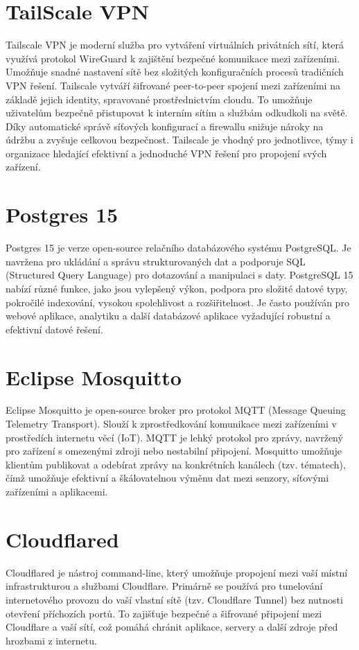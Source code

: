 \section{TailScale VPN}\label{sec:tailscale}
Tailscale VPN je moderní služba pro vytváření virtuálních privátních sítí, která využívá protokol WireGuard k zajištění bezpečné komunikace mezi zařízeními. Umožňuje snadné nastavení sítě bez složitých konfiguračních procesů tradičních VPN řešení. Tailscale vytváří šifrované peer-to-peer spojení mezi zařízeními na základě jejich identity, spravované prostřednictvím cloudu. To umožňuje uživatelům bezpečně přistupovat k interním sítím a službám odkudkoli na světě. Díky automatické správě síťových konfigurací a firewallu snižuje nároky na údržbu a zvyšuje celkovou bezpečnost. Tailscale je vhodný pro jednotlivce, týmy i organizace hledající efektivní a jednoduché VPN řešení pro propojení svých zařízení.

\section{Postgres 15}\label{sec:postgres-15}
Postgres 15 je verze open-source relačního databázového systému PostgreSQL. Je navržena pro ukládání a správu strukturovaných dat a podporuje SQL (Structured Query Language) pro dotazování a manipulaci s daty.
PostgreSQL 15 nabízí různé funkce, jako jsou vylepšený výkon, podpora pro složité datové typy, pokročilé indexování, vysokou spolehlivost a rozšiřitelnost.
Je často používán pro webové aplikace, analytiku a další databázové aplikace vyžadující robustní a efektivní datové řešení.

\section{Eclipse Mosquitto}\label{sec:eclipse-mosquitto}
Eclipse Mosquitto je open-source broker pro protokol MQTT (Message Queuing Telemetry Transport).
Slouží k zprostředkování komunikace mezi zařízeními v prostředích internetu věcí (IoT). MQTT je lehký protokol pro zprávy, navržený pro zařízení s omezenými zdroji nebo nestabilní připojení.
Mosquitto umožňuje klientům publikovat a odebírat zprávy na konkrétních kanálech (tzv. tématech), čímž umožňuje efektivní a škálovatelnou výměnu dat mezi senzory, síťovými zařízeními a aplikacemi.

\section{Cloudflared}\label{sec:cloudflared}
Cloudflared je nástroj command-line, který umožňuje propojení mezi vaší místní infrastrukturou a službami Cloudflare.
Primárně se používá pro tunelování internetového provozu do vaší vlastní sítě (tzv. Cloudflare Tunnel) bez nutnosti otevření příchozích portů.
To zajišťuje bezpečné a šifrované připojení mezi Cloudflare a vaší sítí, což pomáhá chránit aplikace, servery a další zdroje před hrozbami z internetu.